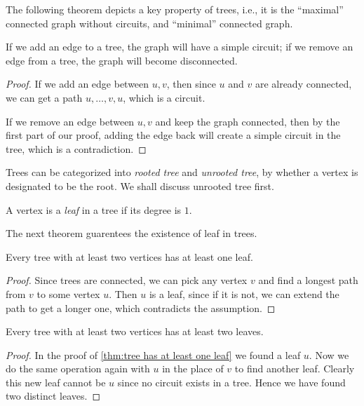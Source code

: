 The following theorem depicts a key property of trees, i.e., it is the ``maximal'' connected graph without circuits, and ``minimal'' connected graph.

\begin{theorem}\label{thm:key property of trees}
    If we add an edge to a tree, the graph will have a simple circuit; if we remove an edge from a tree, the graph will become disconnected. 
\end{theorem}

\begin{proof}
    If we add an edge between $u,v$, then since $u$ and $v$ are already connected, we can get a path $u,\dots,v,u$, which is a circuit. 

    If we remove an edge between $u,v$ and keep the graph connected, then by the first part of our proof, adding the edge back will create a simple circuit in the tree, which is a contradiction. 
\end{proof}

Trees can be categorized into \emph{rooted tree} and \emph{unrooted tree}, by whether a vertex is designated to be the root. We shall discuss unrooted tree first. 

\begin{definition}[Leaf]
    A vertex is a \emph{leaf} in a tree if its degree is $1$. 
\end{definition}

The next theorem guarentees the existence of leaf in trees. 

\begin{theorem}\label{thm:tree has at least one leaf}
    Every tree with at least two vertices has at least one leaf.
\end{theorem}

\begin{proof}
    Since trees are connected, we can pick any vertex $v$ and find a longest path from $v$ to some vertex $u$. Then $u$ is a leaf, since if it is not, we can extend the path to get a longer one, which contradicts the assumption.
\end{proof}

\begin{corollary}
    Every tree with at least two vertices has at least two leaves.
\end{corollary}

\begin{proof}
    In the proof of \cref{thm:tree has at least one leaf} we found a leaf $u$. Now we do the same operation again with $u$ in the place of $v$ to find another leaf. Clearly this new leaf cannot be $u$ since no circuit exists in a tree. Hence we have found two distinct leaves.
\end{proof}

